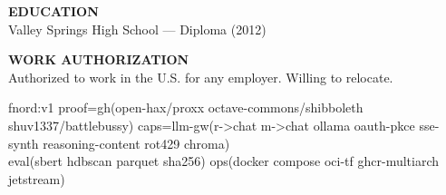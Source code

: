 \documentclass[10pt]{article}
\begin{document}
\vspace{6pt}
\textbf{EDUCATION}\\
Valley Springs High School --- Diploma (2012)

\vspace{2pt}
\textbf{WORK AUTHORIZATION}\\
Authorized to work in the U.S. for any employer. Willing to relocate.

\vspace{4pt}
{\scriptsize\ttfamily
fnord:v1\; proof=gh(open-hax/proxx octave-commons/shibboleth shuv1337/battlebussy)\; caps=llm-gw(r->chat m->chat ollama oauth-pkce sse-synth reasoning-content rot429 chroma)\\
eval(sbert hdbscan parquet sha256)\; ops(docker compose oci-tf ghcr-multiarch jetstream)
}
\end{document}
